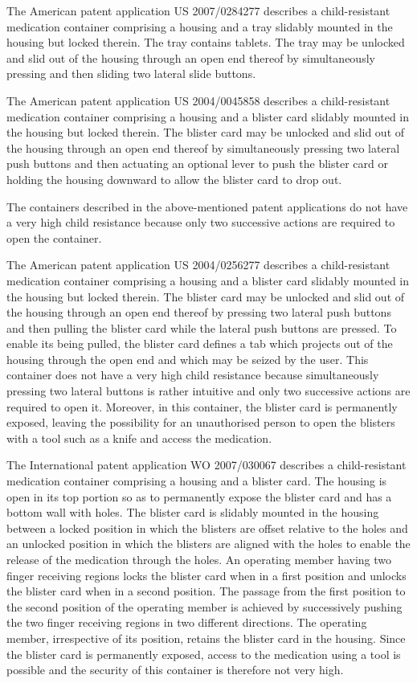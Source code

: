 \documentclass[11pt,a4paper]{article}
\begin{document}
The American patent application US 2007/0284277 describes a child-resistant medication container comprising a housing and a tray slidably mounted in the housing but locked therein. The tray contains tablets. The tray may be unlocked and slid out of the housing through an open end thereof by simultaneously pressing and then sliding two lateral slide buttons.

The American patent application US 2004/0045858 describes a child-resistant medication container comprising a housing and a blister card slidably mounted in the housing but locked therein. The blister card may be unlocked and slid out of the housing through an open end thereof by simultaneously pressing two lateral push buttons and then actuating an optional lever to push the blister card or holding the housing downward to allow the blister card to drop out.

The containers described in the above-mentioned patent applications do not have a very high child resistance because only two successive actions are required to open the container.

The American patent application US 2004/0256277 describes a child-resistant medication container comprising a housing and a blister card slidably mounted in the housing but locked therein. The blister card may be unlocked and slid out of the housing through an open end thereof by pressing two lateral push buttons and then pulling the blister card while the lateral push buttons are pressed. To enable its being pulled, the blister card defines a tab which projects out of the housing through the open end and which may be seized by the user. This container does not have a very high child resistance because simultaneously pressing two lateral buttons is rather intuitive and only two successive actions are required to open it. Moreover, in this container, the blister card is permanently exposed, leaving the possibility for an unauthorised person to open the blisters with a tool such as a knife and access the medication.

The International patent application WO 2007/030067 describes a child-resistant medication container comprising a housing and a blister card. The housing is open in its top portion so as to permanently expose the blister card and has a bottom wall with holes. The blister card is slidably mounted in the housing between a locked position in which the blisters are offset relative to the holes and an unlocked position in which the blisters are aligned with the holes to enable the release of the medication through the holes. An operating member having two finger receiving regions locks the blister card when in a first position and unlocks the blister card when in a second position. The passage from the first position to the second position of the operating member is achieved by successively pushing the two finger receiving regions in two different directions. The operating member, irrespective of its position, retains the blister card in the housing. Since the blister card is permanently exposed, access to the medication using a tool is possible and the security of this container is therefore not very high.
\end{document}
